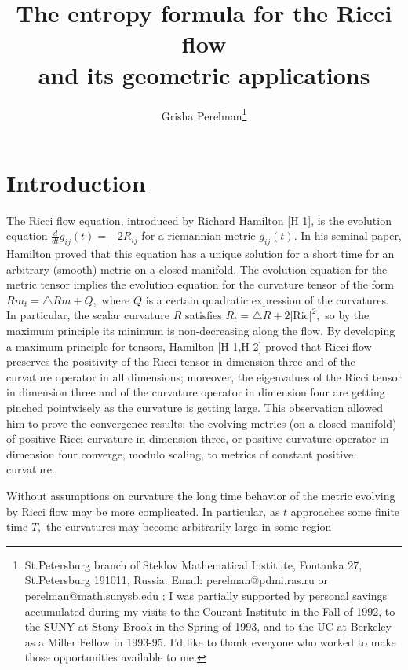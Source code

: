 \documentclass[12pt]{article}
\theoremstyle{plain}
{\swapnumbers
\newtheorem{thm}{Theorem}[section]
\newtheorem{cor}[thm]{Corollary}
\newtheorem{lem}[thm]{Lemma}
\newtheorem{prop}[thm]{Proposition}
}
\theoremstyle{definition}
{\swapnumbers
\newtheorem{defn}[thm]{Definition}
\newtheorem{nota}[thm]{Notation}
\newtheorem{parag}[thm]{}
\newtheorem*{parstr}{\addtocounter{thm}{1}\thesection.\arabic{thm}*}
\newtheorem*{intropar}{\addtocounter{thm}{1}\arabic{thm}}
}
\theoremstyle{remark} {\swapnumbers
\newtheorem{rem}[thm]{Remark}
\newtheorem{exam}[thm]{Example}
\newtheorem{lemma}[thm]{Lemma}
\newtheorem{claim}[thm]{Claim}
}
\numberwithin{equation}{section}
\begin{document}
\title{The entropy formula for the Ricci flow \\ and its geometric
applications }\author{Grisha Perelman\thanks{St.Petersburg branch
of Steklov Mathematical Institute, Fontanka 27, St.Petersburg
191011, Russia. Email: perelman@pdmi.ras.ru or
perelman@math.sunysb.edu ; I was partially supported by personal
savings accumulated during my visits to the Courant Institute in
the Fall of 1992, to the SUNY at Stony Brook in the Spring of
1993, and to the UC at Berkeley as a Miller Fellow in 1993-95. I'd
like to thank everyone who worked to make those opportunities
available to me.}} \maketitle
\section*{Introduction} \begin{intropar}The Ricci flow equation, introduced
by Richard Hamilton [H 1], is the evolution equation
$\frac{d}{dt}g_{ij}(t)=-2R_{ij}$ for a riemannian metric
$g_{ij}(t).$ In his seminal paper, Hamilton proved that this
equation has a unique solution for a short time for an arbitrary
(smooth) metric on a closed manifold. The evolution equation for
the metric tensor implies the evolution equation for the curvature
tensor of the form $Rm_t=\triangle Rm +Q,$ where $Q$ is a certain
quadratic expression of the curvatures. In particular, the scalar
curvature $R$ satisfies $R_t=\triangle R+2|\mbox{Ric}|^2,$ so by
the maximum principle its minimum is non-decreasing along the
flow. By developing a maximum principle for tensors, Hamilton [H
1,H 2] proved that Ricci flow preserves the positivity of the
Ricci tensor in dimension three and of the curvature operator in
all dimensions; moreover, the eigenvalues of the Ricci tensor in
dimension three and of the curvature operator in dimension four
are getting pinched pointwisely as the curvature is getting large.
This observation allowed him to prove the convergence results: the
evolving metrics (on a closed manifold) of positive Ricci
curvature in dimension three, or positive curvature operator in
dimension four converge, modulo scaling, to metrics of constant
positive curvature. \par Without assumptions on curvature the long
time behavior of the metric evolving by Ricci flow may be more
complicated. In particular, as $t$ approaches some finite time
$T,$ the curvatures may become arbitrarily large in some region

\end{intropar}
\end{document}
